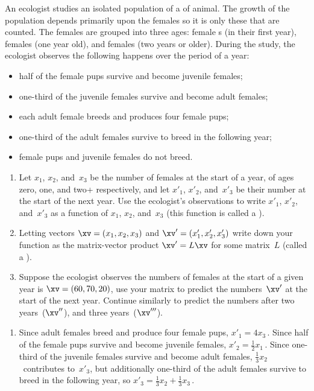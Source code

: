 \begin{example} \label{eg:matasp}
An ecologist studies an isolated population of a  of animal.
The growth of the population depends primarily upon the females so it is only these that are counted.
The females are grouped into three ages: female s (in their first year),  females (one year old), and  females (two years or older).
During the study, the ecologist observes the following happens over the period of a year:
\begin{itemize}
\item  half of the female pups survive and become juvenile females;
\item  one-third of the juvenile females survive and become adult females;
\item  each adult female breeds and produces four female pups;
\item  one-third of the adult females survive to breed in the following year;
\item  female pups and juvenile females do not breed.
\end{itemize}
\begin{enumerate}
\item Let \(x_1\), \(x_2\), and~\(x_3\) be the number of females at the start of a year, of ages zero, one, and two+ respectively, and let \(x'_1\), \(x'_2\), and~\(x'_3\) be their number at the start of the next year.
Use the ecologist's observations to write \(x'_1\), \(x'_2\), and~\(x'_3\) as a function of \(x_1\), \(x_2\), and~\(x_3\)  (this function is called a ).
\item Letting vectors \(\xv=(x_1,x_2,x_3)\) and \(\xv'=(x'_1,x'_2,x'_3)\) write down your function as the matrix-vector product \(\xv'=L\xv\) for some matrix~\(L\) (called a ).
\item Suppose the ecologist observes the numbers of females at the start of a given year is \(\xv=(60,70,20)\), use your matrix to predict the numbers~\(\xv'\) at the start of the next year.  
Continue similarly to predict the numbers after two years~(\(\xv''\)), and three years~(\(\xv'''\)).
\end{enumerate}

\begin{solution} 
\begin{enumerate}
\item Since adult females breed and produce four female pups, \(x'_1=4x_3\)\,.
Since half of the female pups survive and become juvenile females, \(x'_2=\frac12x_1\)\,.
Since one-third of the juvenile females survive and become adult females, \(\frac13x_2\)~contributes to~\(x'_3\), but additionally one-third of the adult females survive to breed in the following year, so  \(x'_3=\frac13x_2+\frac13x_3\)\,.


\end{enumerate}
\end{solution}
\end{example}
